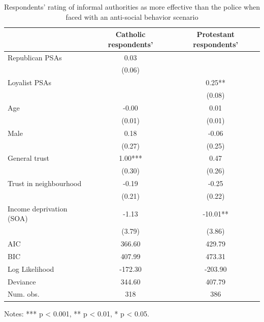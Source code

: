 \documentclass[12pt,letterpaper]{article}
\begin{document}
	\begin{table}[htbp]
		\centering
		\caption{Respondents' rating of informal authorities as more effective than the police when faced with an anti-social behavior scenario}
		\begin{tabular}{lcc}
			\toprule
			& \textbf{Catholic respondents'} & \textbf{Protestant respondents'} \\
			\midrule
			Republican PSAs             & 0.03 & \\
			& (0.06) & \\
			Loyalist PSAs               & & 0.25** \\
			& & (0.08) \\
			Age                         & -0.00 & 0.01 \\
			& (0.01) & (0.01) \\
			Male                        & 0.18 & -0.06 \\
			& (0.27) & (0.25) \\
			General trust               & 1.00*** & 0.47 \\
			& (0.30) & (0.26) \\
			Trust in neighbourhood     & -0.19 & -0.25 \\
			& (0.21) & (0.22) \\
			Income deprivation (SOA)   & -1.13 & -10.01** \\
			& (3.79) & (3.86) \\
			\midrule
			AIC                         & 366.60 & 429.79 \\
			BIC                         & 407.99 & 473.31 \\
			Log Likelihood              & -172.30 & -203.90 \\
			Deviance                    & 344.60 & 407.79 \\
			Num. obs.                   & 318 & 386 \\
			\bottomrule
		\end{tabular}
		\label{tab:informal_authorities_comparison}
		\medskip
		\small
		\raggedright
		Notes: *** p < 0.001, ** p < 0.01, * p < 0.05.
	\end{table}
	\newpage
\end{document}
